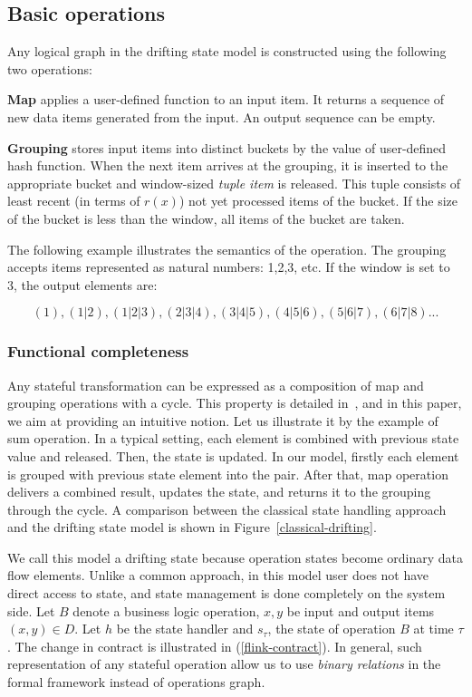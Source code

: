 \subsection{Basic operations}

Any logical graph in the drifting state model is constructed using the following two operations:

{\bf Map} applies a user-defined function to an input item. It returns a sequence of new data items generated from the input. An output sequence can be empty.

{\bf Grouping} stores input items into distinct buckets by the value of user-defined hash function. When the next item arrives at the grouping, it is inserted to the appropriate bucket and window-sized {\it tuple item} is released. This tuple consists of least recent (in terms of $r(x)$) not yet processed items of the bucket. If the size of the bucket is less than the window, all items of the bucket are taken.

The following example illustrates the semantics of the operation. The grouping accepts items represented as natural numbers: 1,2,3, etc. If the window is set to 3, the output elements are:

\[(1), (1|2), (1|2|3), (2|3|4), (3|4|5), (4|5|6), (5|6|7), (6|7|8)...\]

\subsubsection{Functional completeness}

Any stateful transformation can be expressed as a composition of map and grouping operations with a cycle. This property is detailed in~\cite{we2018adbis}, and in this paper, we aim at providing an intuitive notion. Let us illustrate it by the example of sum operation. In a typical setting, each element is combined with previous state value and released. Then, the state is updated. In our model, firstly each element is grouped with previous state element into the pair. After that, map operation delivers a combined result, updates the state, and returns it to the grouping through the cycle. A comparison between the classical state handling approach and the drifting state model is shown in Figure~\ref{classical-drifting}.

We call this model a drifting state because operation states become ordinary data flow elements. Unlike a common approach, in this model user does not have direct access to state, and state management is done completely on the system side. Let $B$ denote a business logic operation, $x, y$ be input and output items $(x,y)\in D$. Let $h$ be the state handler and $s_\tau$, the state of operation $B$ at time $\tau$. The change in contract is illustrated in (\ref{flink-contract}). In general, such representation of any stateful operation allow us to use {\em binary relations} in the formal framework instead of operations graph.

